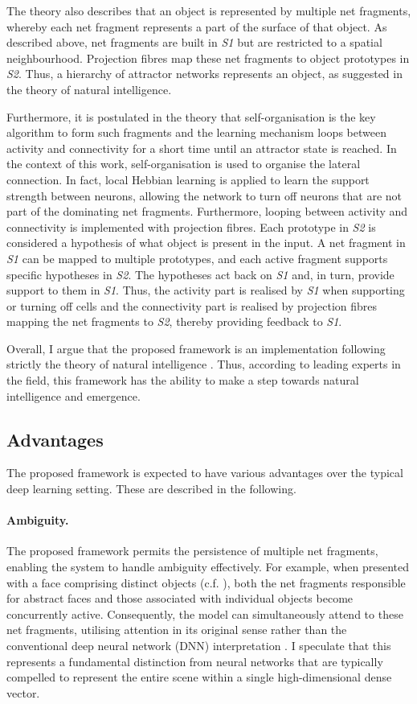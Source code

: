 The theory also describes that an object is represented by multiple net fragments, whereby each net fragment represents a part of the surface of that object.
As described above, net fragments are built in \emph{S1} but are restricted to a spatial neighbourhood. Projection fibres map these net fragments to object prototypes in \emph{S2}. Thus, a hierarchy of attractor networks represents an object, as suggested in the theory of natural intelligence.

Furthermore, it is postulated in the theory that self-organisation is the key algorithm to form such fragments and the learning mechanism loops between activity and connectivity for a short time until an attractor state is reached.
In the context of this work, self-organisation is used to organise the lateral connection. In fact, local Hebbian learning is applied to learn the support strength between neurons, allowing the network to turn off neurons that are not part of the dominating net fragments.
Furthermore, looping between activity and connectivity is implemented with projection fibres. 
Each prototype in \emph{S2} is considered a hypothesis of what object is present in the input. A net fragment in \emph{S1} can be mapped to multiple prototypes, and each active fragment supports specific hypotheses in \emph{S2}. The hypotheses act back on \emph{S1} and, in turn, provide support to them in \emph{S1}. Thus, the activity part is realised by \emph{S1} when supporting or turning off cells and the connectivity part is realised by projection fibres mapping the net fragments to \emph{S2}, thereby providing feedback to \emph{S1}.

Overall, I argue that the proposed framework is an implementation following strictly the theory of natural intelligence \cite{von_der_malsburg_theory_2022}. Thus, according to leading experts in the field, this framework has the ability to make a step towards natural intelligence and emergence. 

\subsection{Advantages}
The proposed framework is expected to have various advantages over the typical deep learning setting. These are described in the following.

\paragraph{Ambiguity.} The proposed framework permits the persistence of multiple net fragments, enabling the system to handle ambiguity effectively. For example, when presented with a face comprising distinct objects (c.f. ), both the net fragments responsible for abstract faces and those associated with individual objects become concurrently active. Consequently, the model can simultaneously attend to these net fragments, utilising attention in its original sense rather than the conventional deep neural network (DNN) interpretation . I speculate that this represents a fundamental distinction from neural networks that are typically compelled to represent the entire scene within a single high-dimensional dense vector.

